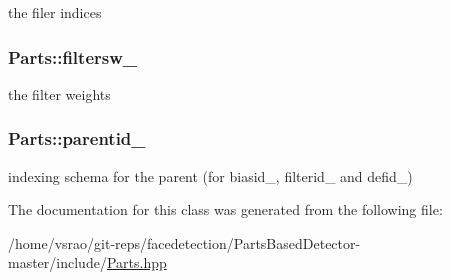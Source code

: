 the filer indices 

\hypertarget{classParts_a1de4d2cb595176d37aae609acbce88d8}{
\subsubsection[{filtersw\-\_\-}]{ Parts\-::filtersw\-\_\-\hspace{0.3cm}{\ttfamily [private]}}}\label{classParts_a1de4d2cb595176d37aae609acbce88d8}


the filter weights 

\hypertarget{classParts_ad74222c286ee6ee93659109a6d1d625f}{
\subsubsection[{parentid\-\_\-}]{ Parts\-::parentid\-\_\-\hspace{0.3cm}{\ttfamily [private]}}}\label{classParts_ad74222c286ee6ee93659109a6d1d625f}


indexing schema for the parent (for biasid\-\_\-, filterid\-\_\- and defid\-\_\-) 



The documentation for this class was generated from the following file\-:\begin{DoxyCompactItemize}
\item 
/home/vsrao/git-\/reps/facedetection/\-Parts\-Based\-Detector-\/master/include/\hyperlink{Parts_8hpp}{Parts.\-hpp}\end{DoxyCompactItemize}
